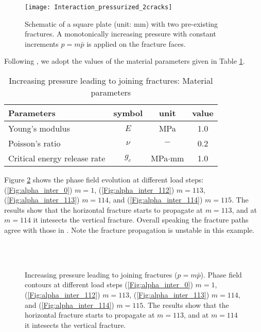 \begin{figure}[htbp]
	\centering
	\texttt{[image: Interaction\_pressurized\_2cracks]}
	\caption{{Schematic of a square plate (unit: mm) with two pre-existing fractures.
			A monotonically increasing pressure with constant increments $p=m\bar{p}$ is applied on the fracture faces.}}
	\label{Fig:Notched_geometry}
\end{figure}

{Following \cite{Wheeler201469}, we adopt the values of the material parameters given in Table \ref{Tab:Join_input}.}

\begin{table}[htbp]
	\centering
	\color{black}
	\caption{{Increasing pressure leading to joining fractures: Material parameters \cite{Wheeler201469}}}
	\begin{tabular}{l c c c}
		\hline 
		Parameters & symbol & unit& value \\
		\hline 
		Young's modulus & $E$ &MPa& 1.0\\
		Poisson's ratio & $\nu$ &$-$&  0.2\\
		Critical energy release rate & $g_c$ &MPa$\cdot$mm&  1.0\\
		\hline      
	\end{tabular}
	\label{Tab:Join_input}
\end{table}

{Figure \ref{Fig:Alpha_pressurized_interaction_snapshots} shows the phase field evolution at different load steps: (\ref{Fig:alpha_inter_0}) $m=1$, (\ref{Fig:alpha_inter_112}) $m=113$, (\ref{Fig:alpha_inter_113}) $m=114$, and (\ref{Fig:alpha_inter_114}) $m=115$. The results show that the horizontal fracture starts to propagate at $m=113$, and at $m=114$ it intesects the vertical fracture.
	Overall speaking the fracture paths agree with those in \cite{Wheeler201469}. Note the fracture propagation is unstable in this example.}

\begin{figure}[htbp]
\centering %
\\
\\

\caption{{Increasing pressure leading to joining fractures ($p=m\bar{p}$). Phase field contours at different load steps (\ref{Fig:alpha_inter_0}) $m=1$, (\ref{Fig:alpha_inter_112}) $m=113$, (\ref{Fig:alpha_inter_113}) $m=114$, and (\ref{Fig:alpha_inter_114}) $m=115$. The results show that the horizontal fracture  starts to propagate at $m=113$, and at $m=114$ it intesects the vertical fracture.}}
\label{Fig:Alpha_pressurized_interaction_snapshots}
\end{figure}

